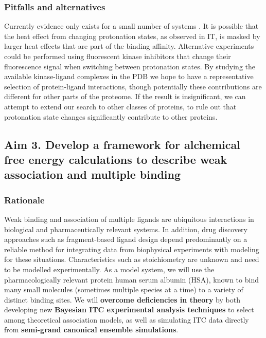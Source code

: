 \documentclass[10pt,final]{article}
\begin{document}
\subsubsection*{Pitfalls and alternatives}
Currently evidence only exists for a small number of systems \cite{Aleksandrov2007a,Czodrowski2007a}. It is possible that the heat effect from changing protonation states, as observed in IT, is masked by larger heat effects that are part of the binding affinity. Alternative experiments could be performed using fluorescent kinase inhibitors that change their fluorescence signal when switching between protonation states.
By studying the available kinase-ligand complexes in the PDB we hope to have a representative selection of protein-ligand interactions, though potentially these contributions are different for other parts of the proteome. If the result is insignificant, we can attempt to extend our search to other classes of proteins, to rule out that protonation state changes significantly contribute to other proteins.

\subsection*{Aim 3. Develop a framework for alchemical free energy calculations to describe weak association and multiple binding}
\subsubsection*{Rationale}
Weak binding and association of multiple ligands are ubiquitous interactions in biological and pharmaceutically relevant systems.
In addition, drug discovery approaches such as fragment-based ligand design depend predominantly on a reliable method for integrating data from biophysical experiments with modeling for these situations. Characteristics such as stoichiometry are unknown and need to be modelled experimentally.
As a model system, we will use the pharmacologically relevant protein human serum albumin (HSA), known to bind many small molecules (sometimes multiple species at a time) to a variety of distinct binding sites.
We will \textbf{overcome deficiencies in theory} by both developing new \textbf{Bayesian ITC experimental analysis techniques} to select among theoretical association models, as well as simulating ITC data directly from \textbf{semi-grand canonical ensemble simulations}.
\end{document}
